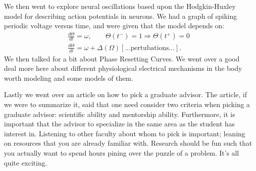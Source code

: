 \documentclass[12pt]{amsart}
\theoremstyle{definition}
\theoremstyle{question}
\begin{document}
\begin{onehalfspace}
        We then went to explore neural oscillations based upon the Hodgkin-Huxley model for describing action potentials
        in neurons.
        We had a graph of spiking periodic voltage versus time, and were given that the model depends on:
        \begin{gather*}
            \frac{d\Theta}{dt} = \omega,\qquad \Theta(t^{-}) = 1 \Rightarrow \Theta(t^{+})=0 \\
            \frac{d\Theta}{dt} = \omega+\Delta(\Omega)[\text{...pertubations...}].
        \end{gather*}
        We then talked for a bit about Phase Resetting Curves.
        We went over a good deal more here about different physiological electrical mechanisms in the body worth
        modeling and some models of them.

        Lastly we went over an article on how to pick a graduate advisor.
        The article, if we were to summarize it, said that one need consider two
        criteria when picking a graduate advisor: scientific ability and mentorship ability.
        Furthermore, it is important that the advisor to specialize in the same area as the
        student has interest in.
        Listening to other faculty about whom to pick is important;
        leaning on resources that you are already familiar with.
        Research should be fun such that you actually want to spend hours pining over
        the puzzle of a problem.
        It's all quite exciting.



    \end{onehalfspace}
\end{document}
